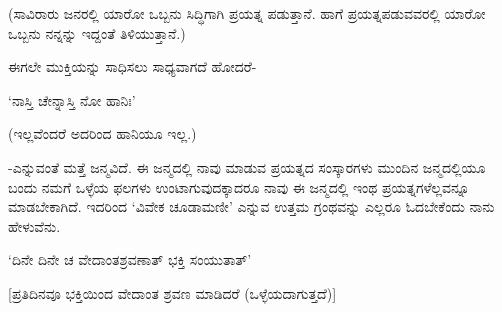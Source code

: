 (ಸಾವಿರಾರು ಜನರಲ್ಲಿ ಯಾರೋ ಒಬ್ಬನು ಸಿದ್ಧಿಗಾಗಿ ಪ್ರಯತ್ನ ಪಡುತ್ತಾನೆ. ಹಾಗೆ ಪ್ರಯತ್ನಪಡುವವರಲ್ಲಿ ಯಾರೋ ಒಬ್ಬನು ನನ್ನನ್ನು ಇದ್ದಂತೆ ತಿಳಿಯುತ್ತಾನೆ.)

ಈಗಲೇ ಮುಕ್ತಿಯನ್ನು ಸಾಧಿಸಲು ಸಾಧ್ಯವಾಗದೆ ಹೋದರೆ-

\begin{shloka}
`ನಾಸ್ತಿ ಚೇನ್ನಾಸ್ತಿ ನೋ ಹಾನಿಃ'
\end{shloka}

(ಇಲ್ಲವೆಂದರೆ ಅದರಿಂದ ಹಾನಿಯೂ ಇಲ್ಲ.)

-ಎನ್ನುವಂತೆ ಮತ್ತೆ ಜನ್ಮವಿದೆ. ಈ ಜನ್ಮದಲ್ಲಿ ನಾವು ಮಾಡುವ ಪ್ರಯತ್ನದ ಸಂಸ್ಕಾರಗಳು ಮುಂದಿನ ಜನ್ಮದಲ್ಲಿಯೂ ಬಂದು ನಮಗೆ ಒಳ್ಳೆಯ ಫಲಗಳು ಉಂಟಾಗುವುದಕ್ಕಾದರೂ ನಾವು ಈ ಜನ್ಮದಲ್ಲಿ ಇಂಥ ಪ್ರಯತ್ನಗಳೆಲ್ಲವನ್ನೂ ಮಾಡಬೇಕಾಗಿದೆ. ಇದರಿಂದ `ವಿವೇಕ ಚೂಡಾಮಣೀ' ಎನ್ನುವ ಉತ್ತಮ ಗ್ರಂಥವನ್ನು ಎಲ್ಲರೂ ಓದಬೇಕೆಂದು ನಾನು ಹೇಳುವೆನು.

\begin{shloka}
`ದಿನೇ ದಿನೇ ಚ ವೇದಾಂತಶ್ರವಣಾತ್ ಭಕ್ತಿ ಸಂಯುತಾತ್'
\end{shloka}

[ಪ್ರತಿದಿನವೂ ಭಕ್ತಿಯಿಂದ ವೇದಾಂತ ಶ್ರವಣ ಮಾಡಿದರೆ (ಒಳ್ಳೆಯದಾಗುತ್ತದೆ)]

